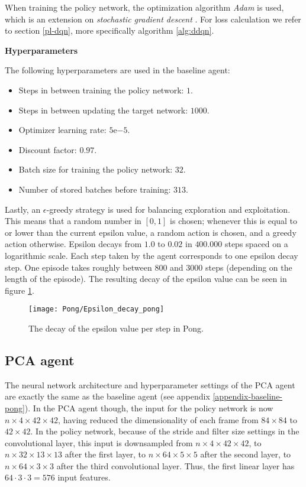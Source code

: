 When training the policy network, the optimization algorithm \emph{Adam} is used, which is an extension on \emph{stochastic gradient descent} \cite{adam}. For loss calculation we refer to section \ref{pl-dqn}, more specifically algorithm \ref{alg:ddqn}.\newline

\noindent\textbf{Hyperparameters}\par
\noindent The following hyperparameters are used in the baseline agent:
\begin{itemize}
\item Steps in between training the policy network: $1$.
\item Steps in between updating the target network: $1000$.
\item Optimizer learning rate: $5\mathrm{e}{-5}$.
\item Discount factor: $0.97$.
\item Batch size for training the policy network: $32$.
\item Number of stored batches before training: $313$.
\end{itemize}

Lastly, an $\epsilon$-greedy strategy is used for balancing exploration and exploitation. This means that a random number in $[0,1]$ is chosen; whenever this is equal to or lower than the current epsilon value, a random action is chosen, and a greedy action otherwise. Epsilon decays from $1.0$ to $0.02$ in $400.000$ steps spaced on a logarithmic scale. Each step taken by the agent corresponds to one epsilon decay step. One episode takes roughly between $800$ and $3000$ steps (depending on the length of the episode). The resulting decay of the epsilon value can be seen in figure \ref{fig:epsilon-pong}.

\begin{figure}[h]
    \centering
    \texttt{[image: Pong/Epsilon\_decay\_pong]}
    \caption{The decay of the epsilon value per step in Pong.}
    \label{fig:epsilon-pong}
\end{figure}

\subsection{PCA agent}
The neural network architecture and hyperparameter settings of the PCA agent are exactly the same as the baseline agent (see appendix \ref{appendix-baseline-pong}). In the PCA agent though, the input for the policy network is now $n \times 4 \times 42 \times 42$, having reduced the dimensionality of each frame from $84 \times 84$ to $42 \times 42$. In the policy network, because of the stride and filter size settings in the convolutional layer, this input is downsampled from $n \times 4 \times 42 \times 42$, to $n \times 32 \times 13 \times 13$ after the first layer, to $n \times 64 \times 5 \times 5$ after the second layer, to $n \times 64 \times 3 \times 3$ after the third convolutional layer. Thus, the first linear layer has $64 \cdot 3 \cdot 3 = 576$ input features.


